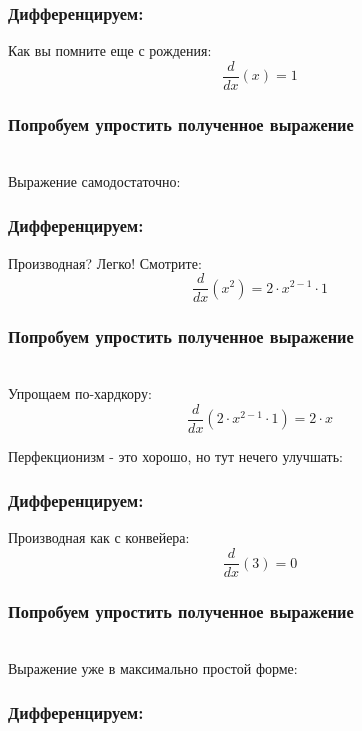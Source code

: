 \documentclass[a4paper,12pt]{article}
\begin{document}
\subsubsection*{Дифференцируем:}

Как вы помните еще с рождения:
\begin{dmath}\frac{d}{dx}\left(x\right)=1\end{dmath}
\subsubsection*{Попробуем упростить полученное выражение}
\\Выражение самодостаточно:

\subsubsection*{Дифференцируем:}

Производная? Легко! Смотрите:
\begin{dmath}\frac{d}{dx}\left(x^{2}\right)=2\cdot x^{2- 1}\cdot 1\end{dmath}
\subsubsection*{Попробуем упростить полученное выражение}
\\Упрощаем по-хардкору:\\
\begin{dmath}
	\frac{d}{dx}\left(2\cdot x^{2- 1}\cdot 1\right) = 2\cdot x\end{dmath}

Перфекционизм - это хорошо, но тут нечего улучшать:

\subsubsection*{Дифференцируем:}

Производная как с конвейера:
\begin{dmath}\frac{d}{dx}\left(3\right)=0\end{dmath}
\subsubsection*{Попробуем упростить полученное выражение}
\\Выражение уже в максимально простой форме:

\subsubsection*{Дифференцируем:}
\end{document}
